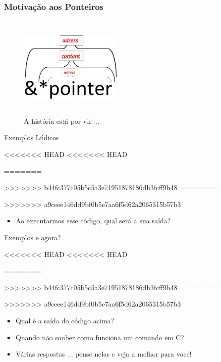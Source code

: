 \begin{frame}[allowframebreaks=0.9]

\frametitle{Motivação aos Ponteiros}
\begin{figure}[ht]
  \begin{center}

\includegraphics[height=5cm, width=5cm]{figs/fig_ponteiros/hierarq_pointer.png}

    \caption{A história está por vir ...}
  \end{center}
\end{figure}

\end{frame}


\begin{frame}{Exemplos Lúdicos}

<<<<<<< HEAD
<<<<<<< HEAD

=======

>>>>>>> b44fc377c05b5c5a3e71951878186db3fcff9b48
=======

>>>>>>> a9ceee146dd9bf0b5e7aa6f5d62a2065315b57b3
\pause

\begin{itemize}
  \item Ao executarmos esse código, qual será a sua saída?
\end{itemize}
\end{frame}



\begin{frame}{Exemplos e agora?}

<<<<<<< HEAD
<<<<<<< HEAD

=======

>>>>>>> b44fc377c05b5c5a3e71951878186db3fcff9b48
=======

>>>>>>> a9ceee146dd9bf0b5e7aa6f5d62a2065315b57b3
\pause



\pause
\begin{itemize}
  \item Qual é a saída do código acima? 
  \item Quando não souber como funciona um comando em C?
  \item Várias respostas ... pense nelas e veja a melhor para voce!

\end{itemize}
\end{frame}


